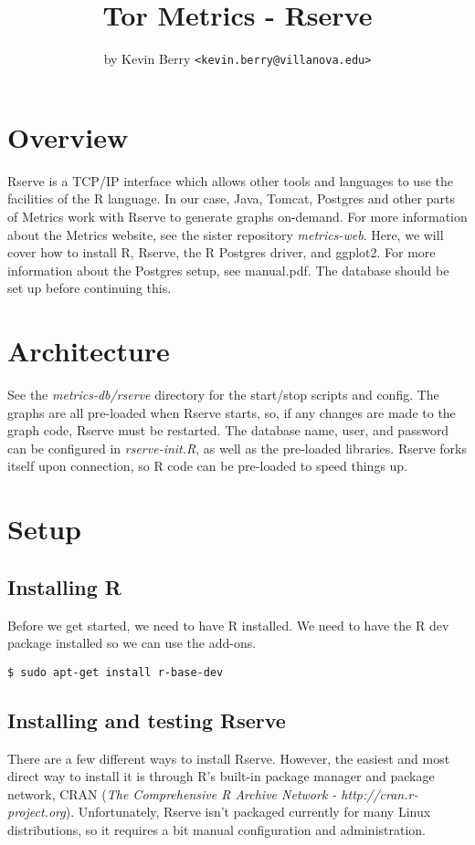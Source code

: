 \documentclass{article}
\begin{document}
\title{Tor Metrics - Rserve}
\author{by Kevin Berry \texttt{<kevin.berry@villanova.edu>}}
\maketitle
\section{Overview}
Rserve is a TCP/IP interface which allows other tools and languages to use
the facilities of the R language. In our case, Java, Tomcat, Postgres and
other parts of Metrics work with Rserve to generate graphs on-demand. For
more information about the Metrics website, see the sister repository
\emph{metrics-web}. Here, we will cover how to install R, Rserve, the R
Postgres driver, and ggplot2. For more information about the Postgres
setup, see manual.pdf. The database should be set up before continuing
this.

\section{Architecture}
See the \emph{metrics-db/rserve} directory for the start/stop scripts and
config. The graphs are all pre-loaded when Rserve starts, so, if any
changes are made to the graph code, Rserve must be restarted. The database
name, user, and password can be configured in \emph{rserve-init.R}, as well
as the pre-loaded libraries. Rserve forks itself upon connection, so R code
can be pre-loaded to speed things up.

\section{Setup}
\subsection{Installing R}
Before we get started, we need to have R installed. We need to have the R
dev package installed so we can use the add-ons.

\begin{verbatim}
$ sudo apt-get install r-base-dev
\end{verbatim}

\subsection{Installing and testing Rserve}
There are a few different ways to install Rserve. However, the easiest and
most direct way to install it is through R's built-in package manager and
package network, CRAN (\emph{The Comprehensive R Archive Network -
http://cran.r-project.org}). Unfortunately, Rserve isn't packaged currently
for many Linux distributions, so it requires a bit manual configuration and
administration.
\\
\end{document}

